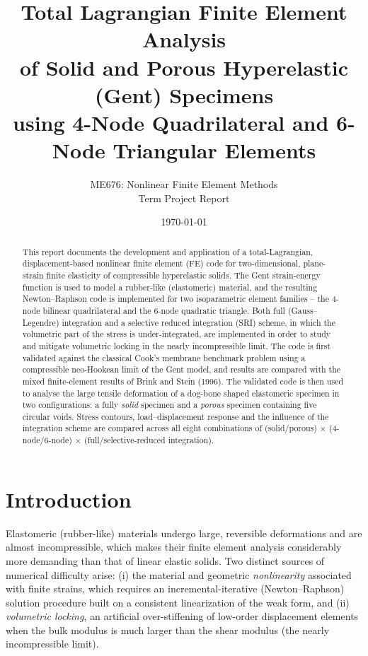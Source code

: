 \documentclass[11pt,a4paper]{article}
\title{\vspace{-1.5cm}\textbf{Total Lagrangian Finite Element Analysis \\
of Solid and Porous Hyperelastic (Gent) Specimens \\
using 4-Node Quadrilateral and 6-Node Triangular Elements}}
\author{ME676: Nonlinear Finite Element Methods \\ Term Project Report}
\date{\today}
\begin{document}
\maketitle
\thispagestyle{fancy}

\begin{abstract}
\noindent This report documents the development and application of a total-Lagrangian, displacement-based
nonlinear finite element (FE) code for two-dimensional, plane-strain finite elasticity of compressible
hyperelastic solids. The Gent strain-energy function is used to model a rubber-like (elastomeric) material,
and the resulting Newton--Raphson code is implemented for two isoparametric element families -- the
4-node bilinear quadrilateral and the 6-node quadratic triangle. Both full (Gauss--Legendre) integration
and a selective reduced integration (SRI) scheme, in which the volumetric part of the stress is
under-integrated, are implemented in order to study and mitigate volumetric locking in the nearly
incompressible limit. The code is first validated against the classical Cook's membrane benchmark problem
using a compressible neo-Hookean limit of the Gent model, and results are compared with the mixed
finite-element results of Brink and Stein (1996). The validated code is then used to analyse the large
tensile deformation of a dog-bone shaped elastomeric specimen in two configurations: a fully \emph{solid}
specimen and a \emph{porous} specimen containing five circular voids. Stress contours, load--displacement
response and the influence of the integration scheme are compared across all eight combinations of
(solid/porous) $\times$ (4-node/6-node) $\times$ (full/selective-reduced integration).
\end{abstract}

\tableofcontents
\newpage

\section{Introduction}
Elastomeric (rubber-like) materials undergo large, reversible deformations and are almost incompressible,
which makes their finite element analysis considerably more demanding than that of linear elastic solids.
Two distinct sources of numerical difficulty arise: (i) the material and geometric \emph{nonlinearity}
associated with finite strains, which requires an incremental-iterative (Newton--Raphson) solution
procedure built on a consistent linearization of the weak form, and (ii) \emph{volumetric locking}, an
artificial over-stiffening of low-order displacement elements when the bulk modulus is much larger than
the shear modulus (the nearly incompressible limit).
\end{document}

